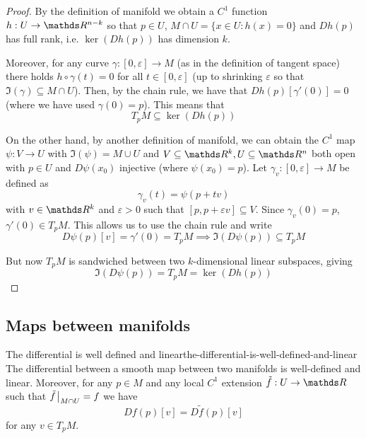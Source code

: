 \documentclass[12pt]{extarticle}
\numberwithin{equation}{subsection}
\begin{document}
\begin{proof}
	By the definition of manifold we obtain a $C^1$ function $h: U \to \R^{n-k}$ so that $p \in U$,
	$M \cap U = \{x \in U: h(x) = 0 \}$ and $Dh(p)$ has full rank, i.e. $\ker(Dh(p))$ has dimension
	$k$.

	Moreover, for any curve $\gamma: [0, \varepsilon] \to M$ (as in the definition of tangent space)
	there holds $h \circ \gamma(t) = 0$ for all $t \in [0, \varepsilon]$ (up to shrinking
	$\varepsilon$ so that $\Im(\gamma) \subseteq M \cap U$).
	Then, by the chain rule, we have that $Dh(p)[\gamma'(0)] = 0$ (where we have used
	$\gamma(0) = p$). This means that
	\begin{equation}
		T_p M \subseteq \ker(Dh(p))
	\end{equation}

	On the other hand, by another definition of manifold, we can obtain the $C^1$ map $\psi: V \to U$
	with $\Im(\psi) = M \cup U$ and $V \subseteq \R^k, U \subseteq \R^n$ both open with $p \in U$ and
	$D \psi(x_0)$ injective (where $\psi(x_0) = p$).
	Let $\gamma_v: [0, \varepsilon] \to M$ be defined as
	\begin{equation}
		\gamma_v(t) = \psi(p + tv)
	\end{equation}
	with $v \in \R^k$ and $\varepsilon >0$ such that $[p, p + \varepsilon v] \subseteq V$.
	Since $\gamma_v(0) = p$, $\gamma'(0) \in T_p M$. This allows us to use the chain rule and write
	\begin{equation}
		D\psi(p)[v] = \gamma'(0) = T_pM \implies \Im(D \psi(p)) \subseteq T_pM
	\end{equation}

	But now $T_pM$ is sandwiched between two $k$-dimensional linear subspaces, giving
	\begin{equation}
		\Im(D\psi(p)) = T_pM = \ker(Dh(p))
	\end{equation}
\end{proof}

\subsection{Maps between manifolds}

\begin{theorem}{The differential is well defined and linear}{the-differential-is-well-defined-and-linear}
	The differential between a smooth map between two manifolds is well-defined and linear.
	Moreover, for any $p \in M$ and any local $C^1$ extension $\tilde f: U \to \R$ such that
	$\tilde f \eval_{M \cap U} = f$ we have
	\begin{equation}
		Df(p)[v] = D \tilde f(p)[v]
	\end{equation}
	for any $v \in T_pM$.
\end{theorem}
\end{document}

